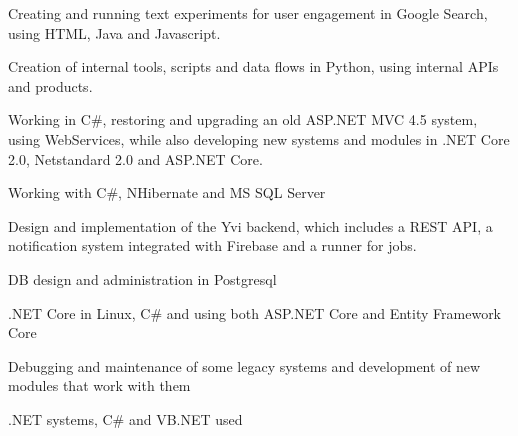 \documentclass[]{plushcv}
\begin{document}
\begin{minipage}[t]{0.70\textwidth}
    \begin{tightemize}
        \sectionsep
        \item Creating and running text experiments for user engagement in Google Search, using HTML, Java and Javascript.
        \item Creation of internal tools, scripts and data flows in Python, using internal APIs and products.
    \end{tightemize}
    \sectionsep

    \begin{tightemize}
        \sectionsep
        \item Working in C\#, restoring and upgrading an old ASP.NET MVC 4.5 system, using WebServices, while also developing new systems and modules in .NET Core 2.0, Netstandard 2.0 and ASP.NET Core.
        \item Working with C\#, NHibernate and MS SQL Server
    \end{tightemize}
    \sectionsep

    \begin{tightemize}
        \sectionsep
        \item Design and implementation of the Yvi backend, which includes a REST API, a notification system integrated with Firebase and a runner for jobs.
        \item DB design and administration in Postgresql
        \item .NET Core in Linux, C\# and using both ASP.NET Core and Entity Framework Core
    \end{tightemize}
    \sectionsep

    \begin{tightemize}
        \sectionsep
        \item Debugging and maintenance of some legacy systems and development of new modules that work with them
        \item .NET systems, C\# and VB.NET used
    \end{tightemize}
    \sectionsep


\end{minipage}
\end{document}
